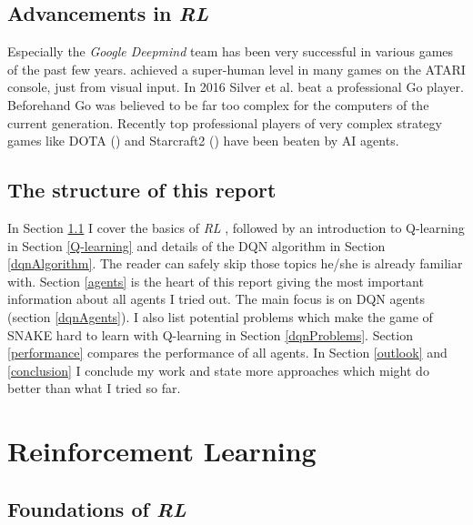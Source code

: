 \documentclass{article}
\newcommand{\RL}{\emph{RL} }
\begin{document}
\subsection{Advancements in \emph{RL}}
 Especially the \emph{Google Deepmind} team has been very successful in various games of the past few years. \cite{atari} achieved a super-human level in many games on the ATARI console, just from visual input. 
 In 2016 Silver et al. \cite{alphaGo} beat a professional Go player. Beforehand Go was believed to be far too complex for the computers of the current generation. Recently top professional players of very complex strategy games like DOTA  (\cite{openAiDota}) and Starcraft2 (\cite{alphaStar}) have been beaten by AI agents.
 
 \subsection{The structure of this report}
 In Section \ref{rl} I cover the basics of \RL, followed by an introduction to Q-learning in Section \ref{Q-learning} and details of the DQN algorithm in Section \ref{dqnAlgorithm}. The reader can safely skip those topics he/she is already familiar with. Section \ref{agents} is the heart of this report giving the most important information about all agents I tried out. The main focus is on DQN agents (section \ref{dqnAgents}). I also list potential problems which make the game of SNAKE hard to learn with Q-learning in Section \ref{dqnProblems}. Section \ref{performance} compares the performance of all agents. In Section \ref{outlook} and \ref{conclusion} I conclude my work and state more approaches which might do better than what I tried so far.


\section{Reinforcement Learning}

\subsection{Foundations of \RL}
\label{rl}
\end{document}
